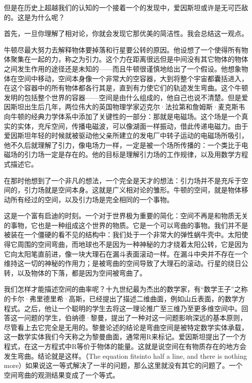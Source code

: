    但是在历史上超越我们的认知的一个接着一个的发现中，爱因斯坦或许是无可匹敌的。这是为什么呢？

   首先，一旦你理解了相对论，你就会发现它那优美的简洁性。我会总结这一观点。

   牛顿尽最大努力去解释物体要掉落和行星要公转的原因。他设想了一个使得所有物体聚集在一起的力，称之为引力。这个力在距离很远但是中间没有其它物体的物体之间发生作用的途径还是未知的——而且牛顿很谨慎地给出了一个假设。他想象物体在空间中移动，空间本身像一个非常大的空容器，大到将整个宇宙都囊括进入，在这个容器中的所有物体都各行其是，直到有力使它们的轨迹发生弯曲。这个牛顿发明的包括整个世界的容器——空间是由什么组成的，他自己也说不清楚。但是爱因斯坦出生后几年，两位伟大的英国物理学家迈克尔·法拉第和詹姆斯·麦克斯韦向牛顿的经典力学体系中添加了关键性的一部分：那就是电磁场。这个场是一个真实的实体，充斥空间，传播电磁波，可以像湖面一样振动，借此传递电磁力。由于爱因斯坦年轻的时候就被驱动他父亲所建立的发电厂中转子运动的电磁场所吸引，他不久后就理解了引力，像电场力一样，一定是被一个场所传播的：一个类比于电磁场的引力场一定是存在的。他的目标是理解引力场的工作规律，以及用数学方程式描述它。

   在那时他想到了一个非凡的想法，一个完全是天才的想法：引力场并不是充斥于空间的，引力场就是空间本身。这就是广义相对论的雏形。牛顿的空间，就是物体移动所有经过的空间，以及引力场是完全相同的一个事物。

   这是一个富有启迪的时刻。一个对于世界极为重要的简化：空间不再是和物质无关的事物，它也是一种组成这个世界的物质。它是一个可以弯曲的事物。我们并不是被装在一个僵硬的看不见的结构中：我们处于一个非常大的弹性蜗牛壳中。太阳使得它周围的空间弯曲，而地球也不是因为一种神秘的力才绕着太阳公转，它是因为它向太阳笔直前进，像一块大理石在漏斗表面滚动一样。在漏斗中央并不存在一个维持这一切的神秘的作用力；是被弯曲的空间导致了大理石的滚动。行星的绕日公转，以及物体的下落，都是因为空间被弯曲了。

   我们怎样才能描述空间的曲率呢？十九世纪最为杰出的数学家，有“数学王子”之称的卡尔·弗里德里希·高斯，已经提出了描述二维曲面，例如山丘表面，的数学方程式。之后，他让一个聪明的学生去将这一理论推广至三维乃至更多维空间中。回答这一问题的学生，伯纳德·黎曼，提出了一种对这一问题影响深远的基本原则，尽管看上去它完全是无用的。黎曼论述的结论是弯曲空间是被特定数学实体承载，这一数学实体我们今天称之为黎曼曲面，通常用R来标记。爱因斯坦提出了一个方程式，在这一方程式中R等价于物体的能量。这就是说空间在有物质存在的地方会发生弯曲。结论就是这样。（The equation fitsinto half a line, and there is nothing more）如果说这一等式解决了一半的问题，那么这里就没有其它的问题了。一个空间弯曲的观测结果变成了一个等式。


